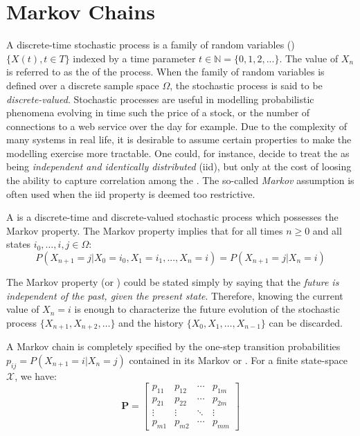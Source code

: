 \section{Markov Chains}

A discrete-time stochastic process is a family of random variables (\rvs)  $\{ X(t), t \in T\}$
indexed by a time parameter $t \in \mathbb{N} = \{0, 1, 2,...\}$. The
value of $X_n$ is referred to as the  of the process. When the family of
random variables is defined over a discrete sample space
$\Omega$, the stochastic process is said to be \textit{discrete-valued}.
Stochastic processes are useful in modelling probabilistic phenomena evolving in
time such the price of a stock, or the
number of connections to a web service over the day for example. Due to the
complexity of many systems in real life, it is desirable to assume certain properties to make the modelling exercise more tractable. One could, for instance, decide to treat the \rvs as being
\textit{independent and identically distributed} (iid), but only at the cost of loosing the ability to
capture correlation among the \rvs. The so-called \textit{Markov}
assumption is often used when the iid property is deemed too restrictive.

\begin{defn}
A  is a discrete-time and discrete-valued stochastic process
which possesses the Markov property. The Markov property implies that for all times $n \geq
0$ and all states $i_0, \dots, i, j \in \Omega$:
\begin{equation}
P(X_{n+1} = j | X_0 = i_0, X_1 = i_1, ..., X_n = i) = P( X_{n+1} = j | X_n = i)
\end{equation}
\end{defn}

The Markov property (or ) could be stated simply by
saying that the \textit{future is independent of the past, given the present state}.
Therefore, knowing the current value of $X_n = i$ is enough to characterize the
future evolution of the stochastic process $\{X_{n+1}, X_{n+2}, \dots \}$ and the history
$\{X_0, X_1,\dots, X_{n-1} \}$ can be discarded.

A Markov chain is completely specified by the one-step transition probabilities
$p_{ij} = P(X_{n+1} = i | X_n = j)$ contained in its Markov or
. For a finite state-space $\mathcal{X}$, we have:
\begin{equation}
\mathbf{P} = \begin{bmatrix}
p_{11} & p_{12} & \cdots & p_{1m} \\
p_{21} & p_{22} & \cdots & p_{2m} \\
\vdots & \vdots & \ddots & \vdots \\
p_{m1} & p_{m2} & \cdots & p_{mm}
\end{bmatrix}
\end{equation}

